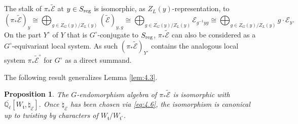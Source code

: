 \documentclass[11pt]{amsart}
\newtheorem{prop}[thm]{Proposition}
\theoremstyle{definition}
\newcommand{\Q}{\mathbb Q}
\def\cE{{\mathcal E}}
\def\reg{{\rm reg}}
\def\ft{{\mathfrak t}}
\begin{document}
The stalk of $\pi_* \tilde{\cE}$ at $y \in S_{\reg}$ 
is isomorphic, as $Z_L (y)$-representation, to
\begin{equation}\label{eq:5.21}
(\pi_* \tilde{\cE})_y \cong \bigoplus_{g \in Z_G (y) / Z_L (y)} (\tilde{\cE})_{y,g}
\cong \bigoplus_{g \in Z_G (y) / Z_L (y)} \cE_{g^{-1} y g} \cong
\bigoplus_{g \in Z_G (y) / Z_L (y)} g \cdot \cE_y .
\end{equation}
On the part $Y^\circ$ of $Y$ that is $G^\circ$-conjugate to $S_{\reg}$, $\pi_* 
\tilde{\cE}$ can also be considered as a $G^\circ$-equivariant local system.
As such $(\pi_* \tilde{\cE} )_{Y^\circ}$ contains the analogous local system
$\pi_* \tilde{\cE}^\circ$ for $G^\circ$ as a direct summand. 

The following result generalizes Lemma \ref{lem:4.3}.

\begin{prop}\label{prop:5.3}
The $G$-endomorphism algebra of $\pi_* \tilde{\cE}$ is isomorphic with
$\overline{\Q_{\ell}}[W_\ft,\natural_\cE]$. Once $\natural_\cE$ has been chosen
via \eqref{eq:4.6}, the isomorphism is canonical up to twisting by characters
of $W_\ft / W_{\ft^\circ}$.
\end{prop}
\end{document}
